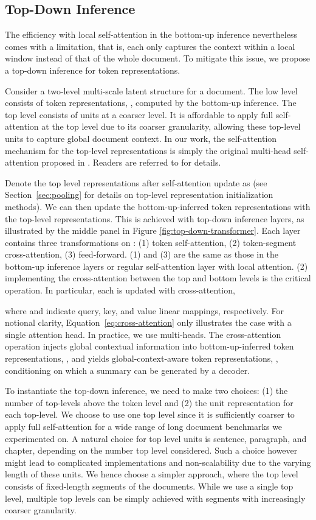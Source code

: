 \documentclass{article} \usepackage{iclr2022_conference,times}
\begin{document}
\subsection{Top-Down Inference}
\label{sec:top-down}
The efficiency with local self-attention in the bottom-up inference nevertheless comes with a limitation, that is, each  only captures the context within a local window instead of that of the whole document. To mitigate this issue, we propose a top-down inference for token representations.

Consider a two-level multi-scale latent structure for a document. The low level consists of token representations, , computed by the bottom-up inference. The top level consists of units at a coarser level. It is affordable to apply full self-attention at the top level due to its coarser granularity, allowing these top-level units to capture global document context. In our work, the self-attention mechanism for the top-level representations is simply the original multi-head self-attention proposed in \cite{vaswani2017attention}. Readers are referred to \cite{vaswani2017attention} for details.


Denote the top level representations after self-attention update as  (see Section~\ref{sec:pooling} for details on top-level representation initialization methods). We can then update the bottom-up-inferred token representations with the top-level representations. This is achieved with  top-down inference layers, as illustrated by the middle panel in Figure \ref{fig:top-down-transformer}. Each layer contains three transformations on : (1) token self-attention, (2) token-segment cross-attention, (3) feed-forward. (1) and (3) are the same as those in the bottom-up inference layers or regular self-attention layer with local attention. (2) implementing the cross-attention between the top and bottom levels is the critical operation. In particular, each  is updated with cross-attention, 

where  and  indicate query, key, and value linear mappings, respectively. For notional clarity, Equation~\ref{eq:cross-attention} only illustrates the case with a single attention head. In practice, we use multi-heads. The cross-attention operation injects global contextual information into bottom-up-inferred token representations, , and yields global-context-aware token representations, , conditioning on which a summary can be generated by a decoder. 

To instantiate the top-down inference, we need to make two choices: (1) the number of top-levels above the token level and (2) the unit representation for each top-level. We choose to use one top level since it is sufficiently coarser to apply full self-attention for a wide range of long document benchmarks we experimented on. A natural choice for top level units is sentence, paragraph, and chapter, depending on the number top level considered. Such a choice however might lead to complicated implementations and non-scalability due to the varying length of these units. We hence choose a simpler approach, where the top level consists of fixed-length segments of the documents. While we use a single top level, multiple top levels can be simply achieved with segments with increasingly coarser granularity. 
\end{document}
